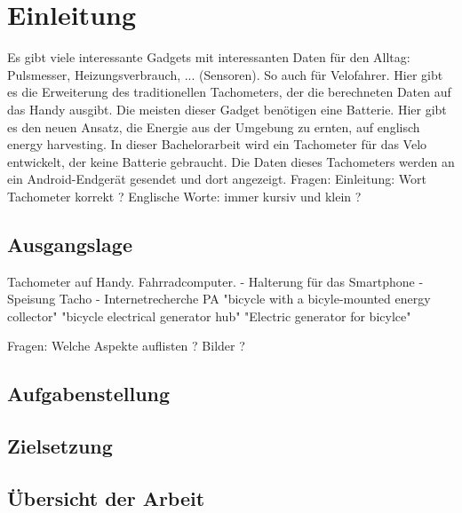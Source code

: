 \chapter{Einleitung}
Es gibt viele interessante Gadgets mit interessanten Daten für den Alltag: Pulsmesser, Heizungsverbrauch, ... (Sensoren). So auch für Velofahrer. Hier gibt es die Erweiterung des traditionellen Tachometers, der die berechneten Daten auf das Handy ausgibt. 
Die meisten dieser Gadget benötigen eine Batterie. Hier gibt es den neuen Ansatz, die Energie aus der Umgebung zu ernten, auf englisch energy harvesting. In dieser Bachelorarbeit wird ein Tachometer für das Velo entwickelt, der keine Batterie gebraucht. Die Daten dieses Tachometers werden an ein Android-Endgerät gesendet und dort angezeigt.
Fragen: 
Einleitung: Wort Tachometer korrekt ?
Englische Worte: immer kursiv und klein ?

\section{Ausgangslage}
Tachometer auf Handy.
Fahrradcomputer.
- Halterung für das Smartphone
- Speisung Tacho
- Internetrecherche PA \cite{PA_bicycle} 
   "bicycle with a bicyle-mounted energy collector"
   "bicycle electrical generator hub"
   "Electric generator for bicylce"

Fragen:
Welche Aspekte auflisten ?  
Bilder ?

\section{Aufgabenstellung}



\section{Zielsetzung}





\section{Übersicht der Arbeit}
